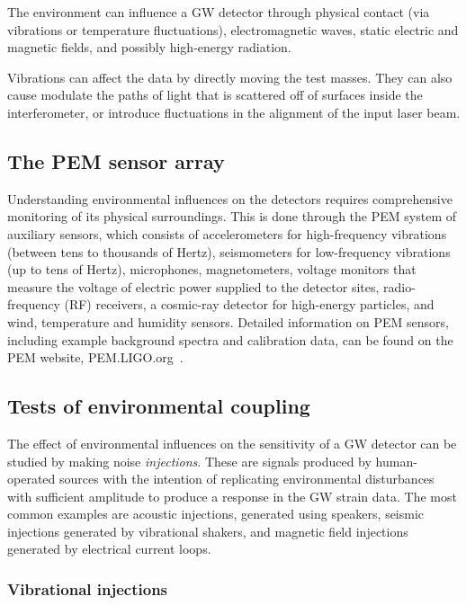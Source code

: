 The environment can influence a \ac{GW} detector through physical contact (via vibrations or temperature fluctuations), electromagnetic waves, static electric and magnetic fields, and possibly high-energy radiation.

Vibrations can affect the data by directly moving the test masses.
They can also cause modulate the paths of light that is scattered off of surfaces inside the interferometer, or introduce fluctuations in the alignment of the input laser beam.

\subsection{The PEM sensor array}

Understanding environmental influences on the detectors requires comprehensive monitoring of its physical surroundings.
This is done through the \ac{PEM} system of auxiliary sensors, which consists of accelerometers for high-frequency vibrations (between tens to thousands of Hertz), seismometers for low-frequency vibrations (up to tens of Hertz), microphones, magnetometers, voltage monitors that measure the voltage of electric power supplied to the detector sites, radio-frequency (RF) receivers, a cosmic-ray detector for high-energy particles, and wind, temperature and humidity sensors.
Detailed information on PEM sensors, including example background spectra and calibration data, can be found on the PEM website, PEM.LIGO.org~\cite{PEM_website}.

\subsection{Tests of environmental coupling}\label{subsec:injections}

The effect of environmental influences on the sensitivity of a \ac{GW} detector can be studied by making noise \textit{injections}.
These are signals produced by human-operated sources with the intention of replicating environmental disturbances with sufficient amplitude to produce a response in the \ac{GW} strain data.
The most common examples are acoustic injections, generated using speakers, seismic injections generated by vibrational shakers, and magnetic field injections generated by electrical current loops.

\subsubsection{Vibrational injections}



